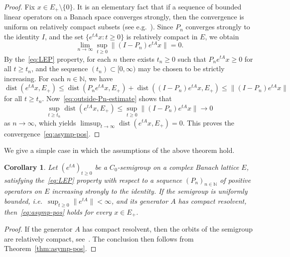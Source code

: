 \documentclass[a4paper, reqno]{amsart}
\numberwithin{equation}{section}
\theoremstyle{plain}
\newtheorem{corollary}[theorem]{Corollary}
\theoremstyle{definition}
\theoremstyle{remark}
\DeclareMathOperator{\dist}{dist}
\newcommand{\NN}{\mathbb{N}}
\begin{document}
\begin{proof}
	Fix $x\in E_+\setminus\{0\}$. It is an elementary fact that if a sequence of bounded linear operators on a Banach space converges strongly, then the convergence is uniform on relatively compact subsets (see e.g.~\cite[III Lemma 3.7]{Kato}). Since $P_n$ converges strongly to the identity $I$, and the set $\{e^{tA}x : t\ge 0\}$ is relatively compact in $E$, we obtain
	\begin{equation}
	\label{eq:outside-Pn-estimate}
		\lim_{n\to\infty}\sup_{t\ge 0}\|(I-P_n)e^{tA}x\| = 0.
	\end{equation}
	By the~\eqref{eq:LEP} property, for each $n$ there exists $t_n \ge 0$ such that $P_n e^{tA}x \ge 0$ for all $t\ge t_n$, and the sequence $(t_n) \subset [0,\infty)$ may be chosen to be strictly increasing. For each $n\in\NN$, we have
	\begin{equation*}
		\dist(e^{tA}x,E_+) \le \dist(P_n e^{tA}x,E_+) + \dist((I-P_n)e^{tA}x,E_+) \le \|(I-P_n)e^{tA}x\|
	\end{equation*}
	for all $t\ge t_n$. Now~\eqref{eq:outside-Pn-estimate} shows that
	\begin{equation*}
		\sup_{t\ge t_n} \dist(e^{tA}x,E_+) \le \sup_{t\ge 0}\|(I-P_n)e^{tA}x\| \longrightarrow 0
	\end{equation*}
	as $n\to\infty$, which yields $\limsup_{t\to\infty} \dist(e^{tA}x,E_+)=0$. This proves the convergence~\eqref{eq:asymp-pos}.
\end{proof}

We give a simple case in which the assumptions of the above theorem hold.
\begin{corollary}
	Let $(e^{tA})_{t\ge 0}$ be a $C_0$-semigroup on a complex Banach lattice $E$, satisfying the~\eqref{eq:LEP} property with respect to a sequence $(P_n)_{n\in\NN}$ of positive operators on $E$ increasing strongly to the identity. If the semigroup is uniformly bounded, i.e.\ $\sup_{t\ge 0}\|e^{tA}\|<\infty$, and its generator $A$ has compact resolvent, then~\eqref{eq:asymp-pos} holds for every $x\in E_+$.
\end{corollary}
\begin{proof}
	If the generator $A$ has compact resolvent, then the orbits of the semigroup are relatively compact, see~\cite[Corollary V.2.15(i)]{EN00}. The conclusion then follows from Theorem~\ref{thm:asymp-pos}.
\end{proof}
\end{document}
